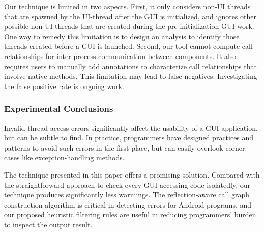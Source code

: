 Our technique is limited in two aspects. First, it only considers
non-UI threads that are spawned by the UI-thread after the GUI
is initialized, and ignores other possible non-UI threads
that are created during the pre-initialization GUI work. One way
to remedy this limitation is to design an analysis to identify
those threads created before a GUI is launched.
Second, our tool cannot compute call relationships
for inter-process communication between components. It also
requires users to manually add annotations to characterize
call relationships that involve native methods. This limitation
may lead to false negatives. Investigating the false positive
rate is ongoing work.




\subsubsection{Experimental Conclusions}

Invalid thread access errors significantly affect the usability of
a GUI application, but can be subtle to find. In practice, programmers
have designed practices and patterns to avoid such errors in the first
place, but can easily overlook corner cases like exception-handling
methods.

The technique presented in this paper offers a promising solution.
Compared with the straightforward approach to check every
GUI accessing code isolatedly, our technique produces significantly
less warniings. The reflection-aware call graph construction algorithm
is critical in detecting errors for Android programs, and our
proposed heuristic filtering rules are useful in reducing programmers'
burden to inspect the output result.


